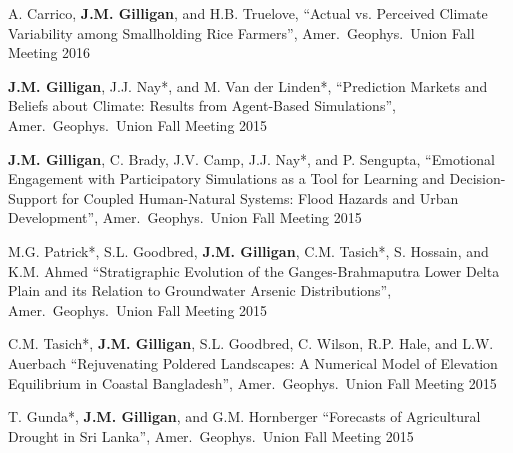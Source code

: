     \item
    A. Carrico, \textbf{J.M. Gilligan}, and H.B. Truelove,
    \enquote{Actual vs. Perceived Climate Variability among Smallholding Rice Farmers},
    Amer.\ Geophys.\ Union Fall Meeting 2016

    \item \textbf{J.M. Gilligan}, J.J. Nay*, and M. Van der Linden*,
    \enquote{Prediction Markets and Beliefs about Climate: Results from Agent-Based Simulations},
    Amer.\ Geophys.\ Union Fall Meeting 2015

    \item \textbf{J.M. Gilligan}, C. Brady, J.V. Camp, J.J. Nay*, and P. Sengupta,
    \enquote{Emotional Engagement with Participatory Simulations as a Tool for Learning and Decision-Support for Coupled Human-Natural Systems: Flood Hazards and Urban Development},
    Amer.\ Geophys.\ Union Fall Meeting 2015

    \item M.G. Patrick*, S.L. Goodbred, \textbf{J.M. Gilligan}, C.M. Tasich*, S. Hossain, and K.M. Ahmed
    \enquote{Stratigraphic Evolution of the Ganges-Brahmaputra Lower Delta Plain and its Relation to Groundwater Arsenic Distributions},
    Amer.\ Geophys.\ Union Fall Meeting 2015

    \item C.M. Tasich*, \textbf{J.M. Gilligan}, S.L. Goodbred, C. Wilson, R.P. Hale, and L.W. Auerbach
    \enquote{Rejuvenating Poldered Landscapes: A Numerical Model of Elevation Equilibrium in Coastal Bangladesh},
    Amer.\ Geophys.\ Union Fall Meeting 2015

    \item T. Gunda*, \textbf{J.M. Gilligan}, and G.M. Hornberger
    \enquote{Forecasts of Agricultural Drought in Sri Lanka},
    Amer.\ Geophys.\ Union Fall Meeting 2015
